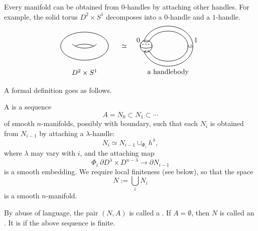 Every manifold can be obtained from $0$-handles
by attaching other handles.
For example, the solid torus $D^2 \times S^1$
decomposes into a $0$-handle and a $1$-handle.
\[ \begin{tikzpicture}[line width=.6]
    \tikzstyle{dp}=[dash pattern=on 2pt off 2pt]
    \draw (0,0) ellipse (1.2 and .7);
    \draw (0,-.1) arc (-90 : -30 : .7 and .4);
    \draw (0,-.1) arc (-90 : -150 : .7 and .4);
    \draw (0,.1) arc (90 : 50 : .7 and .4);
    \draw (0,.1) arc (90 : 130 : .7 and .4);
    
    \node at (2,0) {\text{$\simeq$}};

    \draw[dp] (2.8,0) arc (180 : 50 : .3);
    \draw (2.8,0) arc (180 : 110 : .3);
    \draw (2.8,0) arc (180 : 420 : .3);
    \draw[dp] (2.8,0) arc (180 : 0 : .3 and .1);
    \draw (2.8,0) arc (180 : 360 : .3 and .1);

    \draw (5.45,0) arc (0 : 166 : 1.25 and 1);
    \draw (5.45,0) arc (0 : -165 : 1.25 and 1);
    \draw (5.2,0) arc (0 : 162 : 1 and .75);
    \draw (5.2,0) arc (0 : -161 : 1 and .75);

    \draw[dp] (3,.24) arc (180 : 0 : .12 and .03);
    \draw (3,.24) arc (180 : 360 : .12 and .03);
    \draw[dp] (3.12,-.24) ellipse (.12 and .03);
    \draw[dp] (5.2,0) arc (180 : 0 : .125 and .05);
    \draw (5.2,0) arc (180 : 360 : .125 and .05);

    \node at (0,-1.3) {\text{$D^2 \times S^1$}};
    \node at (4.2,-1.3) {\text{a handlebody}};
    \node at (2.7,.3) {\text{0}};
    \node at (5.6,.3) {\text{1}};
\end{tikzpicture} \]

A formal definition goes as follows.

\begin{definition}
    A  is a sequence
    \[ A = N_0 \subset N_1 \subset \cdots \]
    of smooth $n$-manifolds, possibly with boundary,
    such that each $N_i$ is obtained from $N_{i-1}$
    by attaching a $\lambda$-handle:
    \[ N_i \simeq N_{i-1} \cup_{\Phi_i} h^\lambda, \]
    where $\lambda$ may vary with $i$, and the attaching map
    \[ \Phi_i \: \partial D^\lambda \times D^{n-\lambda} \to \partial N_{i-1} \]
    is a smooth embedding.
    We require local finiteness (see below), so that the space
    \[ N := \bigcup_i N_i \]
    is a smooth $n$-manifold.

    By abuse of language,
    the pair $(N,A)$ is called a .
    If $A=\emptyset$, then $N$ is called an .
    It is  if the above sequence is finite.
\end{definition}

